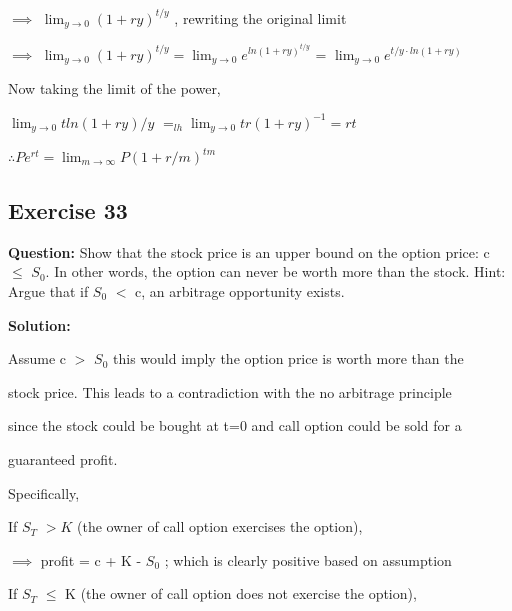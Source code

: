 \documentclass{article}
\begin{document}
\vspace{\baselineskip}

$\implies$ $\lim_{{y\to 0}} (1 + ry) ^ {t/y}$ , rewriting the original limit 

\vspace{\baselineskip}

$\implies$ $\lim_{{y\to 0}} (1 + ry) ^ {t/y} = \lim_{{y\to 0}} e^{ln(1+ry) ^ {t/y}}$ = $\lim_{{y\to 0}} e^ {t/y \cdot {ln(1+ry)}}$

\vspace{\baselineskip}

Now taking the limit of the power,

\vspace{\baselineskip}

$\lim_{{y\to 0}}  tln(1+ry) / y$ $=_{lh} \lim_{{y\to 0}} tr (1 + ry)^ {-1} = rt$

\vspace{\baselineskip}

$\therefore Pe^{rt} = \lim_{m\to\infty} P(1 + r/m) ^ {tm}$

\subsection*{Exercise 33}

\textbf{Question:} Show that the stock price is an upper bound on the option price: c $\leq$ $S_0$.
In other words, the option can never be worth more than the stock. 
Hint: Argue that if $S_0$ $<$ c, an arbitrage opportunity exists.
 
\textbf{Solution:}

Assume c $>$ $S_0$ this would imply the option price is worth more than the 

stock price. This leads to a contradiction with the no arbitrage principle 

since the stock could be bought at t=0 and  call option could be sold for a 

guaranteed profit.

\vspace{\baselineskip}

Specifically,

If  $S_T$ $> K$ (the owner of call option exercises the option),

$\implies$ profit = c + K - $S_0$ ; which is clearly positive based on assumption

\vspace{\baselineskip}

If  $S_T$ $\leq$ K (the owner of call option does not exercise the option),
\end{document}
